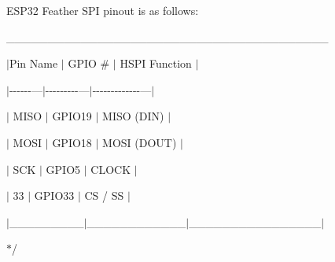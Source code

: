 \begin{DoxyItemize}
\item 
\item ESP32 Feather SPI pinout is as follows\+:
\item \+\_\+\+\_\+\+\_\+\+\_\+\+\_\+\+\_\+\+\_\+\+\_\+\+\_\+\+\_\+\+\_\+\+\_\+\+\_\+\+\_\+\+\_\+\+\_\+\+\_\+\+\_\+\+\_\+\+\_\+\+\_\+\+\_\+\+\_\+\+\_\+\+\_\+\+\_\+\+\_\+\+\_\+\+\_\+\+\_\+\+\_\+\+\_\+\+\_\+\+\_\+\+\_\+\+\_\+\+\_\+\+\_\+\+\_\+
\item $\vert$\+Pin Name $\vert$ GPIO \# $\vert$ HSPI Function $\vert$
\item $\vert$-\/-\/-\/-\/-\/-\/---$\vert$-\/-\/-\/-\/-\/-\/-\/-\/-\/---$\vert$-\/-\/-\/-\/-\/-\/-\/-\/-\/-\/-\/-\/-\/---$\vert$
\item $\vert$ MISO $\vert$ GPIO19 $\vert$ MISO (DIN) $\vert$
\item $\vert$ MOSI $\vert$ GPIO18 $\vert$ MOSI (DOUT) $\vert$
\item $\vert$ SCK $\vert$ GPIO5 $\vert$ CLOCK $\vert$
\item $\vert$ 33 $\vert$ GPIO33 $\vert$ CS / SS $\vert$
\item $\vert$\+\_\+\+\_\+\+\_\+\+\_\+\+\_\+\+\_\+\+\_\+\+\_\+\+\_\+$\vert$\+\_\+\+\_\+\+\_\+\+\_\+\+\_\+\+\_\+\+\_\+\+\_\+\+\_\+\+\_\+\+\_\+\+\_\+$\vert$\+\_\+\+\_\+\+\_\+\+\_\+\+\_\+\+\_\+\+\_\+\+\_\+\+\_\+\+\_\+\+\_\+\+\_\+\+\_\+\+\_\+\+\_\+\+\_\+$\vert$
\item 
\item $\ast$/ 
\end{DoxyItemize}